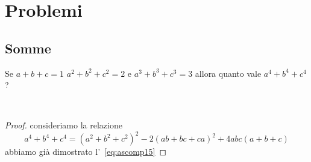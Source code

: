 \chapter{Problemi}
\section{Somme}
\begin{prob}
Se $a+b+c=1$ $a^2+b^2+c^2=2$ e $a^3+b^3+c^3=3$ allora quanto vale $a^4+b^4+c^4$?
\end{prob}~\cite{Gregorio2021}
\begin{proof}
consideriamo la relazione \[a^4+b^4+c^4=(a^2+b^2+c^2)^2-2(ab+bc+ca)^2+4abc(a+b+c)\] abbiamo già dimostrato l'~\vref{eq:ascomp15}
\end{proof}